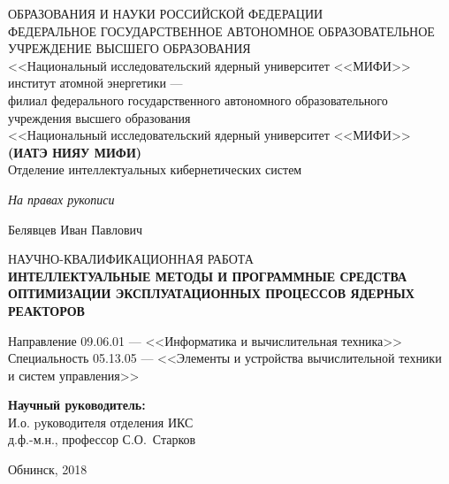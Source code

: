 \thispagestyle{empty}

\begin{center}
{ ОБРАЗОВАНИЯ И НАУКИ РОССИЙСКОЙ ФЕДЕРАЦИИ\\
ФЕДЕРАЛЬНОЕ ГОСУДАРСТВЕННОЕ АВТОНОМНОЕ ОБРАЗОВАТЕЛЬНОЕ УЧРЕЖДЕНИЕ ВЫСШЕГО ОБРАЗОВАНИЯ\\
<<Национальный исследовательский ядерный университет <<МИФИ>>\\
{ институт атомной энергетики ---}\\
филиал федерального государственного автономного образовательного \\ 
учреждения высшего образования\\ 
<<Национальный исследовательский ядерный университет <<МИФИ>>\\
{\bf(ИАТЭ НИЯУ МИФИ)}}\\ 

\vspace{1em}
Отделение интеллектуальных кибернетических систем
\end{center}

\vspace{1em}

\hfill {\it На правах рукописи}
\vspace{5em}
\begin{center}
Белявцев Иван Павлович
\end{center}

\vspace{1em}

\begin{center}
НАУЧНО-КВАЛИФИКАЦИОННАЯ РАБОТА \\
\bf
ИНТЕЛЛЕКТУАЛЬНЫЕ МЕТОДЫ И ПРОГРАММНЫЕ СРЕДСТВА ОПТИМИЗАЦИИ ЭКСПЛУАТАЦИОННЫХ ПРОЦЕССОВ ЯДЕРНЫХ РЕАКТОРОВ
\end{center}

\vspace{2em}
\begin{center}
Направление 09.06.01 --- <<Информатика и вычислительная техника>> \\
Специальность 05.13.05 --- <<Элементы и устройства вычислительной техники\\ и систем управления>>
\end{center}

\vspace{3em}

\hfill \parbox{7.0cm}
{
{\bf Научный руководитель:}\\
И.о. pуководителя отделения ИКС\\
д.ф.-м.н., профессор С.О.~Старков
}


\vspace{\fill}

\begin{center}
Обнинск, 2018
\end{center}

\newpage